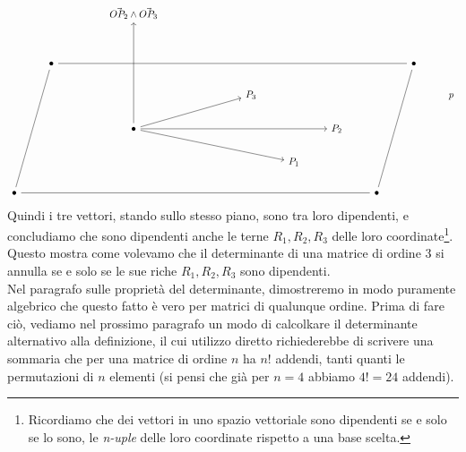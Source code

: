 \documentclass{book}
\begin{document}
\[\begin{tikzcd}
	&&& {\vec{OP_2}\wedge\vec{OP_3}} \\
	\\
	& \bullet &&&&&&&&& \bullet \\
	&&&&&& {P_3} &&&&& {\textit{p}} \\
	&&& \bullet && {} &&& {P_2} \\
	&&&&&&& {P_1} \\
	\bullet &&&&&&&&& \bullet
	\arrow[no head, from=7-1, to=3-2]
	\arrow[no head, from=7-1, to=7-10]
	\arrow[no head, from=7-10, to=3-11]
	\arrow[from=5-4, to=1-4]
	\arrow[from=5-4, to=6-8]
	\arrow[from=5-4, to=5-9]
	\arrow[from=5-4, to=4-7]
	\arrow[no head, from=3-2, to=3-11]
\end{tikzcd}\]
Quindi i tre vettori, stando sullo stesso piano, sono tra loro dipendenti, e
concludiamo che sono dipendenti anche le terne $R_1, R_2, R_3$ delle loro coordinate\footnote{Ricordiamo che dei vettori in uno spazio vettoriale sono dipendenti se e solo se lo sono, le \textit{n-uple} delle loro coordinate rispetto a una base scelta.}. Questo mostra come volevamo che il determinante di una matrice di ordine 3 si annulla se e solo se le sue riche $R_1, R_2,R_3$ sono dipendenti.\\
Nel paragrafo sulle proprietà del determinante, dimostreremo in modo puramente algebrico che questo fatto è vero per matrici di qualunque ordine. Prima di fare ciò, vediamo nel prossimo paragrafo un modo di calcolkare il determinante alternativo alla definizione, il cui utilizzo diretto richiederebbe di scrivere una sommaria che per una matrice di ordine $n$ ha $n!$ addendi, tanti quanti le permutazioni di $n$ elementi (si pensi che già per $n=4$ abbiamo $4!=24$ addendi).
\end{document}
